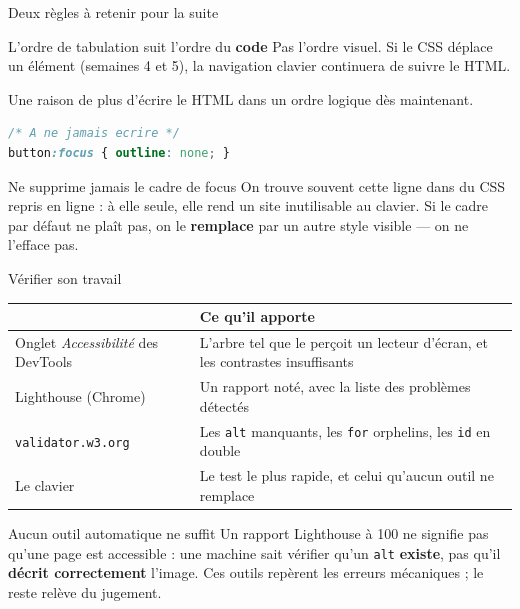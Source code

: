 \documentclass[aspectratio=169,11pt]{beamer}
\newcommand{\hdr}[1]{\multicolumn{1}{l}{\color{white}\bfseries #1}}
\begin{document}
\begin{frame}[fragile]{Deux règles à retenir pour la suite}
  \begin{block}{L'ordre de tabulation suit l'ordre du \textbf{code}}
    Pas l'ordre visuel. Si le CSS déplace un élément (semaines 4 et 5), la navigation clavier continuera de suivre le HTML.
    \vspace{0.1cm}

    Une raison de plus d'écrire le HTML dans un ordre logique dès maintenant.
  \end{block}
  \vspace{0.2cm}
\begin{lstlisting}[language=CSS]
/* A ne jamais ecrire */
button:focus { outline: none; }
\end{lstlisting}
  \vspace{0.1cm}
  \begin{alertblock}{Ne supprime jamais le cadre de focus}
    On trouve souvent cette ligne dans du CSS repris en ligne : à elle seule, elle rend un site inutilisable au clavier. Si le cadre par défaut ne plaît pas, on le \textbf{remplace} par un autre style visible --- on ne l'efface pas.
  \end{alertblock}
\end{frame}

\begin{frame}{Vérifier son travail}
  \vspace{0.1cm}
  \begin{center}
  \small
  \begin{tabularx}{\textwidth}{lX}
    \toprule
    \rowcolor{accentBlue}
    \hdr{Outil} & \hdr{Ce qu'il apporte} \\
    \midrule
    \rowcolor{cfptGrey}
    Onglet \textit{Accessibilité} des DevTools & L'arbre tel que le perçoit un lecteur d'écran, et les contrastes insuffisants \\
    Lighthouse (Chrome) & Un rapport noté, avec la liste des problèmes détectés \\
    \rowcolor{cfptGrey}
    \texttt{validator.w3.org} & Les \texttt{alt} manquants, les \texttt{for} orphelins, les \texttt{id} en double \\
    Le clavier & Le test le plus rapide, et celui qu'aucun outil ne remplace \\
    \bottomrule
  \end{tabularx}
  \end{center}
  \vspace{0.3cm}
  \begin{alertblock}{Aucun outil automatique ne suffit}
    Un rapport Lighthouse à 100 ne signifie pas qu'une page est accessible : une machine sait vérifier qu'un \texttt{alt} \textbf{existe}, pas qu'il \textbf{décrit correctement} l'image. Ces outils repèrent les erreurs mécaniques ; le reste relève du jugement.
  \end{alertblock}
\end{frame}
\end{document}
